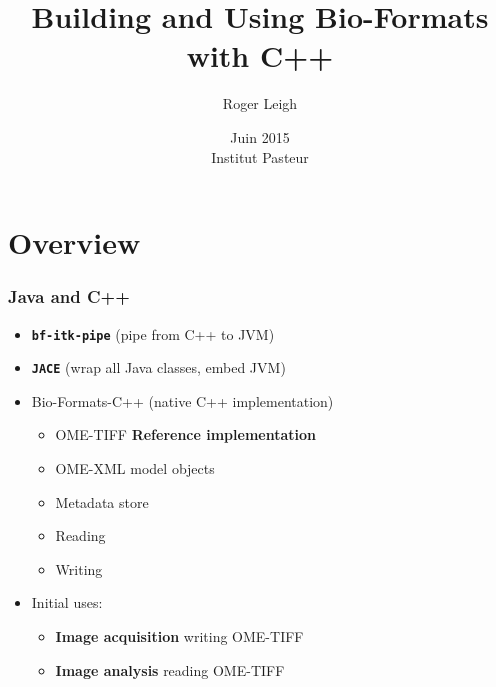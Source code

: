 \documentclass{beamer}
\title{Building and Using Bio-Formats with C++}
\author{Roger Leigh}
\date{Juin 2015\\Institut Pasteur}
\newcommand{\cmd}[1]{\textbf{\texttt{#1}}}
\begin{document}
\begin{frame}[plain]
  \titlepage
  \begin{center}
     \hfill
    \hfill
  \end{center}
\end{frame}

\section[]{Overview}

\begin{frame}
  \frametitle{Java and C++}
  \begin{itemize}
  \item \cmd{bf-itk-pipe} (pipe from C++ to JVM)
  \item \cmd{JACE} (wrap all Java classes, embed JVM)
    \pause
  \item Bio-Formats-C++ (native C++ implementation)
    \begin{itemize}
    \item OME-TIFF \textbf{Reference implementation}
    \item OME-XML model objects
    \item Metadata store
    \item Reading
    \item Writing
    \end{itemize}
    \pause
  \item Initial uses:
    \begin{itemize}
    \item \textbf{Image acquisition} writing OME-TIFF
    \item \textbf{Image analysis} reading OME-TIFF
    \end{itemize}
  \end{itemize}
\end{frame}
\end{document}
